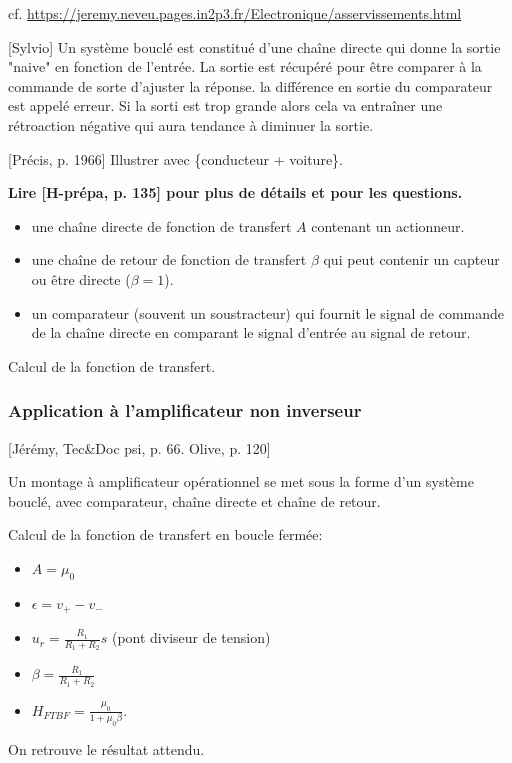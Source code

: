 \documentclass[11pt]{report}
\numberwithin{figure}{section}
\numberwithin{equation}{section}
\numberwithin{table}{section}
\newcommand{\1}{\boldsymbol{1}}
\begin{document}
cf. \url{https://jeremy.neveu.pages.in2p3.fr/Electronique/asservissements.html}

[Sylvio] Un système bouclé est constitué d’une chaîne directe qui donne la sortie "naive" en fonction de l’entrée. La sortie
est récupéré pour être comparer à la commande de sorte d’ajuster la réponse. la différence en sortie du comparateur
est appelé erreur. Si la sorti est trop grande alors cela va entraîner une rétroaction négative qui aura tendance à
diminuer la sortie.

[Précis, p. 1966] Illustrer avec \{conducteur + voiture\}. 

\textbf{Lire [H-prépa, p. 135] pour plus de détails et pour les questions.}

\begin{itemize}
\item une chaîne directe de fonction de transfert $A$ contenant un actionneur.
\item une chaîne de retour de fonction de transfert $\beta$ qui peut contenir un capteur ou être directe ($\beta = 1$).
\item un comparateur (souvent un soustracteur) qui fournit le signal de commande de la chaîne directe en comparant le signal d'entrée au signal de retour.
\end{itemize}

Calcul de la fonction de transfert.

\subsubsection{Application à l'amplificateur non inverseur}

[Jérémy, Tec\&Doc psi, p. 66. Olive, p. 120]

Un montage à amplificateur opérationnel se met sous la forme d'un système bouclé,
avec comparateur, chaîne directe et chaîne de retour. \newline

Calcul de la fonction de transfert en boucle fermée:
\begin{itemize}
\item $A = \mu_0$
\item $\epsilon = v_+ - v_-$
\item $u_r = \frac{R_1}{R_1 + R_2} s$ (pont diviseur de tension)
\item $\beta = \frac{R_1}{R_1 + R_2}$  
\item $H_{FTBF} =  \frac{\mu_0}{1 + \mu_0 \beta}$. 
\end{itemize}
On retrouve le résultat attendu.
\end{document}
